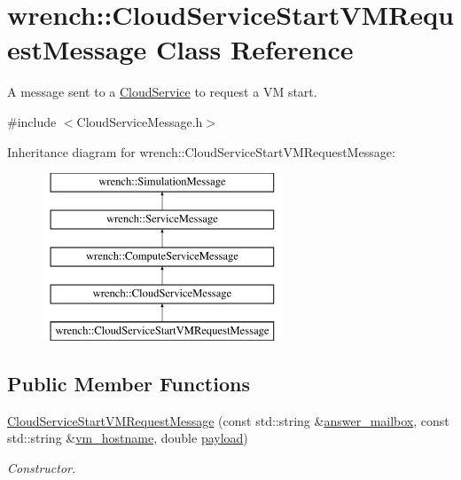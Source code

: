 \hypertarget{classwrench_1_1_cloud_service_start_v_m_request_message}{}\section{wrench\+:\+:Cloud\+Service\+Start\+V\+M\+Request\+Message Class Reference}
\label{classwrench_1_1_cloud_service_start_v_m_request_message}


A message sent to a \hyperlink{classwrench_1_1_cloud_service}{Cloud\+Service} to request a VM start.  




{\ttfamily \#include $<$Cloud\+Service\+Message.\+h$>$}

Inheritance diagram for wrench\+:\+:Cloud\+Service\+Start\+V\+M\+Request\+Message\+:\begin{figure}[H]
\begin{center}
\leavevmode
\includegraphics[height=5.000000cm]{classwrench_1_1_cloud_service_start_v_m_request_message}
\end{center}
\end{figure}
\subsection*{Public Member Functions}
\begin{DoxyCompactItemize}
\item 
\hyperlink{classwrench_1_1_cloud_service_start_v_m_request_message_ad5d57439b0557fb513e8918719426d19}{Cloud\+Service\+Start\+V\+M\+Request\+Message} (const std\+::string \&\hyperlink{classwrench_1_1_cloud_service_start_v_m_request_message_ad118c9c44adeab5d20e36884437931d9}{answer\+\_\+mailbox}, const std\+::string \&\hyperlink{classwrench_1_1_cloud_service_start_v_m_request_message_aefd63dd24deca7f6940db2c006d07557}{vm\+\_\+hostname}, double \hyperlink{classwrench_1_1_simulation_message_a914f2732713f7c02898e66f05a7cb8a1}{payload})
\begin{DoxyCompactList}\small\item\em Constructor. \end{DoxyCompactList}\end{DoxyCompactItemize}
